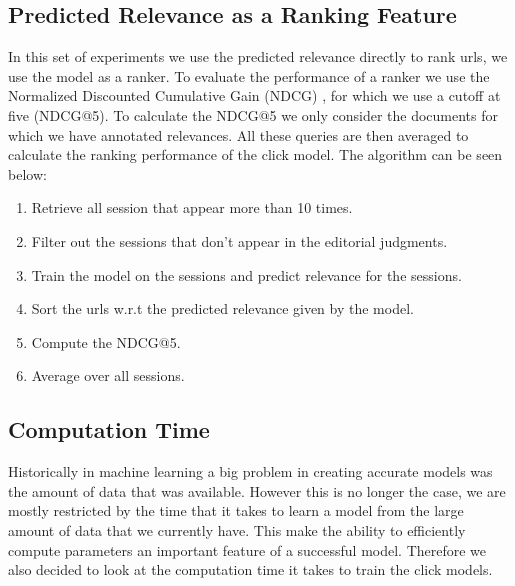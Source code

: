 \subsection{Predicted Relevance as a Ranking Feature}
In this set of experiments we use the predicted relevance directly to rank urls, we use the model as a ranker. To evaluate the performance of a ranker we use the Normalized Discounted Cumulative Gain (NDCG) \cite{NDCG}, for which we use a cutoff at five (NDCG@5). To calculate the NDCG@5 we only consider the documents for which we have annotated relevances. All these queries are then averaged to calculate the ranking performance of the click model. The algorithm can be seen below:

\begin{enumerate}
	\item Retrieve all session that appear more than 10 times.
	\item Filter out the sessions that don't appear in the editorial judgments.
	\item Train the model on the sessions and predict relevance for the sessions.
	\item Sort the urls w.r.t the predicted relevance given by the model.
	\item Compute the NDCG@5.
	\item Average over all sessions.
\end{enumerate}

\subsection{Computation Time}
Historically in machine learning a big problem in creating accurate models was the amount of data that was available. However this is no longer the case, we are mostly restricted by the time that it takes to learn a model from the large amount of data that we currently have. This make the ability to efficiently compute parameters an important feature of a successful model. Therefore we also decided to look at the computation time it takes to train the click models.
